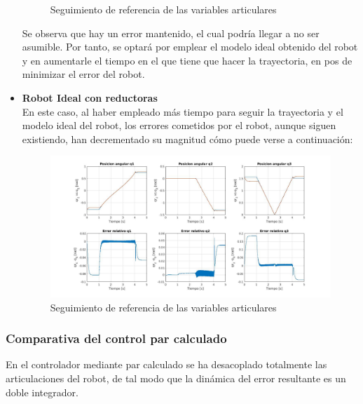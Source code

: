 \begin{itemize}
\begin{figure}[h!]
		\caption{Seguimiento de referencia de las variables articulares}
		
	\end{figure}
	
	
	
	Se observa que hay un error mantenido, el cual podría llegar a no ser asumible. Por tanto, se optará por emplear el modelo ideal obtenido del robot y en aumentarle el tiempo en el que tiene que hacer la trayectoria, en pos de minimizar el error del robot.
	
	
	
	
	\newpage
	\item \textbf{Robot Ideal con reductoras} \\
	
	En este caso, al haber empleado más tiempo para seguir la trayectoria y el modelo ideal del robot, los errores cometidos por el robot, aunque siguen existiendo, han decrementado su magnitud cómo puede verse a continuación:
	
	
	
	\begin{figure}[h!]
		
		\centering
		
		\includegraphics[width=.8\textwidth]{exp3_posPDidealCR_circular_lento}
		
		\caption{Seguimiento de referencia de las variables articulares}
		
	\end{figure}
	
	
	
\end{itemize}



\subsubsection{Comparativa del control par calculado}

En el controlador mediante par calculado se ha desacoplado totalmente las articulaciones del robot, de tal modo que la dinámica del error resultante es un doble integrador. \\

